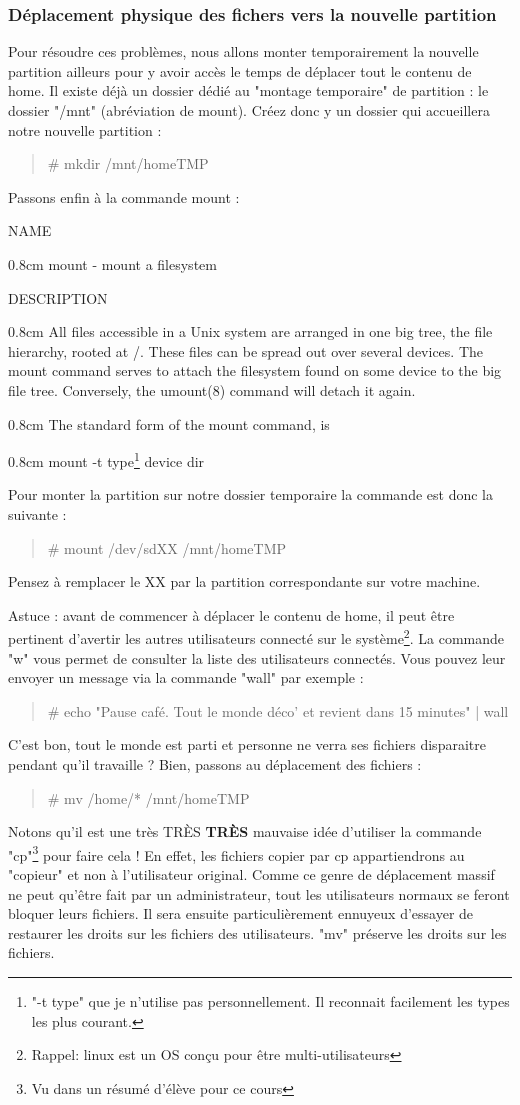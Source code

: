 \documentclass[a4paper]{article}
\newcommand{\commande}[1] {
    \begin{quote}
    \tt\raggedright #1 
    \end{quote}
}
\newcommand{\man}[2]{
    \begin{tcolorbox}[toprule=3mm,width=\textwidth,outer arc=0mm,colbacktitle=grayman,coltitle=black,colback={grayman},colframe={grayman},title={man : \tt #1}]
        \tt\raggedright #2
    \end{tcolorbox}
}
\newcommand{\mandesc}[1]{
    \begin{adjustwidth}{0.8cm}{}
        #1
    \end{adjustwidth}
}
\begin{document}
\subsubsection{Déplacement physique des fichers vers la nouvelle partition}
\par Pour résoudre ces problèmes, nous allons monter temporairement la nouvelle partition ailleurs pour y avoir accès le temps de déplacer tout le contenu de home. Il existe déjà un dossier dédié au "montage temporaire" de partition : le dossier "/mnt" (abréviation de mount). Créez donc y un dossier qui accueillera notre nouvelle partition :
\commande{\# mkdir /mnt/homeTMP}
\par Passons enfin à la commande mount :
\man{mount}{NAME
\mandesc{mount - mount a filesystem}
DESCRIPTION
\mandesc{All  files  accessible  in  a  Unix  system are arranged in one big tree, the file hierarchy, rooted at /.  These files can be spread out over several devices. The mount command serves to attach the filesystem found on some device to the big file tree. Conversely, the umount(8) command will detach it again.}
\mandesc{The standard form of the mount command, is
    \mandesc{mount -t type\footnote{"-t type" que je n'utilise pas personnellement. Il reconnait facilement les types les plus courant.} device dir}
}}
\par Pour monter la partition sur notre dossier temporaire la commande est donc la suivante :
\commande{\# mount /dev/sdXX /mnt/homeTMP}
\par Pensez à remplacer le XX par la partition correspondante sur votre machine.
\par Astuce : avant de commencer à déplacer le contenu de home, il peut être pertinent d'avertir les autres utilisateurs connecté sur le système\footnote{Rappel: linux est un OS conçu pour être multi-utilisateurs}. La commande "w" vous permet de consulter la liste des utilisateurs connectés. Vous pouvez leur envoyer un message via la commande "wall" par exemple :
\commande{\# echo "Pause café. Tout le monde déco' et revient dans 15 minutes" | wall}
\par C'est bon, tout le monde est parti et personne ne verra ses fichiers disparaitre pendant qu'il travaille ? Bien, passons au déplacement des fichiers :
\commande{\# mv /home/* /mnt/homeTMP}
\par Notons qu'il est une très TRÈS \textbf{TRÈS} mauvaise idée d'utiliser la commande "cp"\footnote{Vu dans un résumé d'élève pour ce cours} pour faire cela ! En effet, les fichiers copier par cp appartiendrons au "copieur" et non à l'utilisateur original. Comme ce genre de déplacement massif ne peut qu'être fait par un administrateur, tout les utilisateurs normaux se feront bloquer leurs fichiers. Il sera ensuite particulièrement ennuyeux d'essayer de restaurer les droits sur les fichiers des utilisateurs. "mv" préserve les droits sur les fichiers.
\end{document}
